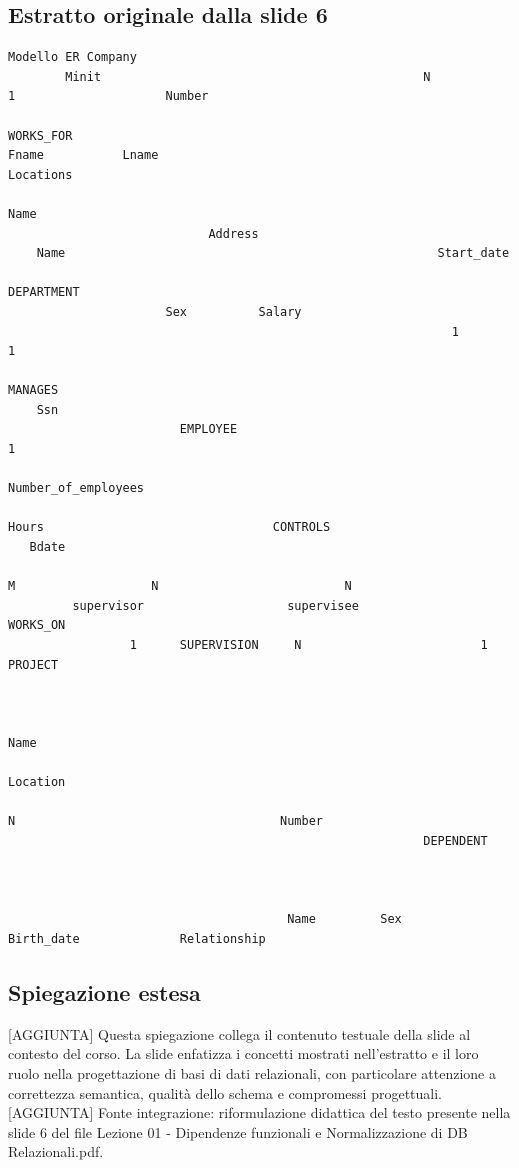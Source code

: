 \documentclass[11pt]{article}
\begin{document}
\subsection*{Estratto originale dalla slide 6}
\begin{lstlisting}
Modello ER Company
        Minit                                             N                           1                     Number
                                                                  WORKS_FOR
Fname           Lname                                                                                                  Locations
                                                                                                     Name
                            Address
    Name                                                    Start_date
                                                                                                             DEPARTMENT
                      Sex          Salary
                                                              1                   1
                                                                      MANAGES
    Ssn
                        EMPLOYEE                                                                                         1
                                                                                      Number_of_employees
                                                                          Hours                                CONTROLS
   Bdate
                                                                      M                   N                          N
         supervisor                    supervisee                           WORKS_ON
                 1      SUPERVISION     N                         1                                          PROJECT


                                                                                                   Name
                                                                                                                         Location
                                                                      N                                     Number
                                                          DEPENDENT



                                       Name         Sex           Birth_date              Relationship
\end{lstlisting}
\subsection*{Spiegazione estesa}
[AGGIUNTA] Questa spiegazione collega il contenuto testuale della slide al contesto del corso. La slide enfatizza i concetti mostrati nell'estratto e il loro ruolo nella progettazione di basi di dati relazionali, con particolare attenzione a correttezza semantica, qualità dello schema e compromessi progettuali.
[AGGIUNTA] Fonte integrazione: riformulazione didattica del testo presente nella slide 6 del file Lezione 01 - Dipendenze funzionali e Normalizzazione di DB Relazionali.pdf.
\end{document}
